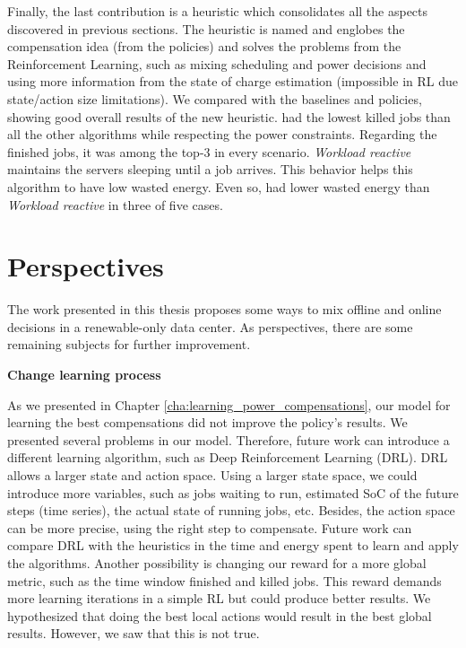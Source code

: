 Finally, the last contribution is a heuristic which consolidates all the aspects discovered in previous sections. The heuristic is named \emph{\systemName} and englobes the compensation idea (from the policies) and solves the problems from the Reinforcement Learning, such as mixing scheduling and power decisions and using more information from the state of charge estimation (impossible in RL due state/action size limitations). We compared \emph{\systemName} with the baselines and policies, showing good overall results of the new heuristic. \emph{\systemName} had the lowest killed jobs than all the other algorithms while respecting the power constraints. Regarding the finished jobs, it was among the top-3 in every scenario. \emph{Workload reactive} maintains the servers sleeping until a job arrives. This behavior helps this algorithm to have low wasted energy. Even so, \emph{\systemName} had lower wasted energy than \emph{Workload reactive} in three of five cases. 

\section{Perspectives}

The work presented in this thesis proposes some ways to mix offline and online decisions in a renewable-only data center. As perspectives, there are some remaining subjects for further improvement.

\textbf{Change learning process}

As we presented in Chapter \ref{cha:learning_power_compensations}, our model for learning the best compensations did not improve the policy's results. We presented several problems in our model. Therefore, future work can introduce a different learning algorithm, such as Deep Reinforcement Learning (DRL). DRL allows a larger state and action space. Using a larger state space, we could introduce more variables, such as jobs waiting to run, estimated SoC of the future steps (time series), the actual state of running jobs, etc. Besides, the action space can be more precise, using the right step to compensate. Future work can compare DRL with the heuristics in the time and energy spent to learn and apply the algorithms. Another possibility is changing our reward for a more global metric, such as the time window finished and killed jobs. This reward demands more learning iterations in a simple RL but could produce better results. We hypothesized that doing the best local actions would result in the best global results. However, we saw that this is not true. 

